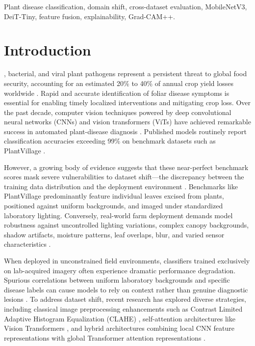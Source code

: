 \documentclass[10pt,journal,compsoc]{IEEEtran}
\begin{document}
\begin{IEEEkeywords}
Plant disease classification, domain shift, cross-dataset evaluation, MobileNetV3, DeiT-Tiny, feature fusion, explainability, Grad-CAM++.
\end{IEEEkeywords}

\section{Introduction}
, bacterial, and viral plant pathogens represent a persistent threat to global food security, accounting for an estimated 20\% to 40\% of annual crop yield losses worldwide \cite{martinelli2015}. Rapid and accurate identification of foliar disease symptoms is essential for enabling timely localized interventions and mitigating crop loss. Over the past decade, computer vision techniques powered by deep convolutional neural networks (CNNs) and vision transformers (ViTs) have achieved remarkable success in automated plant-disease diagnosis \cite{kamilaris2018, mohanty2016, barbedo2018}. Published models routinely report classification accuracies exceeding 99\% on benchmark datasets such as PlantVillage \cite{hughes2015}.

However, a growing body of evidence suggests that these near-perfect benchmark scores mask severe vulnerabilities to dataset shift---the discrepancy between the training data distribution and the deployment environment \cite{candela2009, ferentinos2018}. Benchmarks like PlantVillage predominantly feature individual leaves excised from plants, positioned against uniform backgrounds, and imaged under standardized laboratory lighting. Conversely, real-world farm deployment demands model robustness against uncontrolled lighting variations, complex canopy backgrounds, shadow artifacts, moisture patterns, leaf overlaps, blur, and varied sensor characteristics \cite{singh2020, barbedo2018impact}.

When deployed in unconstrained field environments, classifiers trained exclusively on lab-acquired imagery often experience dramatic performance degradation. Spurious correlations between uniform laboratory backgrounds and specific disease labels can cause models to rely on context rather than genuine diagnostic lesions \cite{lapuschkin2019}. To address dataset shift, recent research has explored diverse strategies, including classical image preprocessing enhancements such as Contrast Limited Adaptive Histogram Equalization (CLAHE) \cite{zuiderveld1994}, self-attention architectures like Vision Transformers \cite{dosovitskiy2021}, and hybrid architectures combining local CNN feature representations with global Transformer attention representations \cite{yuan2021}.
\end{document}
